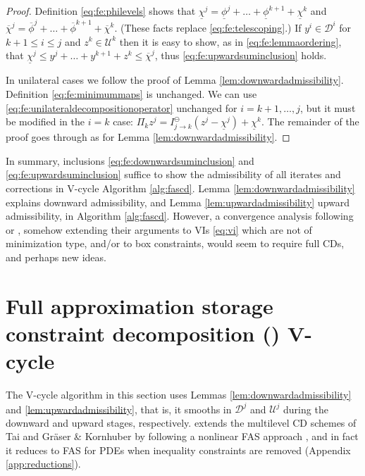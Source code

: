 \documentclass[letterpaper,final,12pt,reqno]{amsart}
\theoremstyle{cstyle}
\theoremstyle{cstyle*}
\theoremstyle{dstyle}
\numberwithin{equation}{section}
\numberwithin{figure}{section}
\numberwithin{table}{section}
\numberwithin{theorem}{section}
\newcommand{\fascd}{\pr{fascd}\xspace}
\begin{document}
\begin{proof}  Definition \eqref{eq:fe:philevels} shows that $\underline{\chi}^j = \underline{\phi}^j + \dots + \underline{\phi}^{k+1} + \underline{\chi}^k$ and $\overline{\chi}^j = \overline{\phi}^j + \dots + \overline{\phi}^{k+1} + \overline{\chi}^k$.  (These facts replace \eqref{eq:fe:telescoping}.)  If $y^i \in \mathcal{D}^i$ for $k+1 \le i \le j$ and $z^k \in \mathcal{U}^k$ then it is easy to show, as in \eqref{eq:fe:lemmaordering}, that $\underline{\chi}^j \le y^j + \dots + y^{k+1} + z^k \le \overline{\chi}^j$, thus \eqref{eq:fe:upwardsuminclusion} holds.

In unilateral cases we follow the proof of Lemma \ref{lem:downwardadmissibility}.  Definition \eqref{eq:fe:minimummaps} is unchanged.  We can use \eqref{eq:fe:unilateraldecompositionoperator} unchanged for $i=k+1,\dots,j$, but it must be modified in the $i=k$ case: $\Pi_k z^j = I_{j\to k}^\ominus(z^j - \underline{\chi}^j) + \underline{\chi}^k$.  The remainder of the proof goes through as for Lemma \ref{lem:downwardadmissibility}.
\end{proof}

In summary, inclusions \eqref{eq:fe:downwardsuminclusion} and \eqref{eq:fe:upwardsuminclusion} suffice to show the admissibility of all iterates and corrections in V-cycle Algorithm \ref{alg:fascd}.  Lemma \ref{lem:downwardadmissibility} explains downward admissibility, and Lemma \ref{lem:upwardadmissibility} upward admissibility, in Algorithm \ref{alg:fascd}.  However, a convergence analysis following \cite{Tai2003} or \cite{GraeserKornhuber2009}, somehow extending their arguments to VIs \eqref{eq:vi} which are not of minimization type, and/or to box constraints, would seem to require full CDs, and perhaps new ideas.


\section{Full approximation storage constraint decomposition (\fascd) V-cycle} \label{sec:vcycle}

The \fascd V-cycle algorithm in this section uses Lemmas \ref{lem:downwardadmissibility} and \ref{lem:upwardadmissibility}, that is, it smooths in $\mathcal{D}^j$ and $\mathcal{U}^j$ during the downward and upward stages, respectively.  \fascd extends the multilevel CD schemes of Tai \cite{Tai2003} and Gr\"aser \& Kornhuber \cite[Algorithm 4.7]{GraeserKornhuber2009} by following a nonlinear FAS approach \cite{BrandtLivne2011}, and in fact it reduces to FAS for PDEs when inequality constraints are removed (Appendix \ref{app:reductions}).
\end{document}
